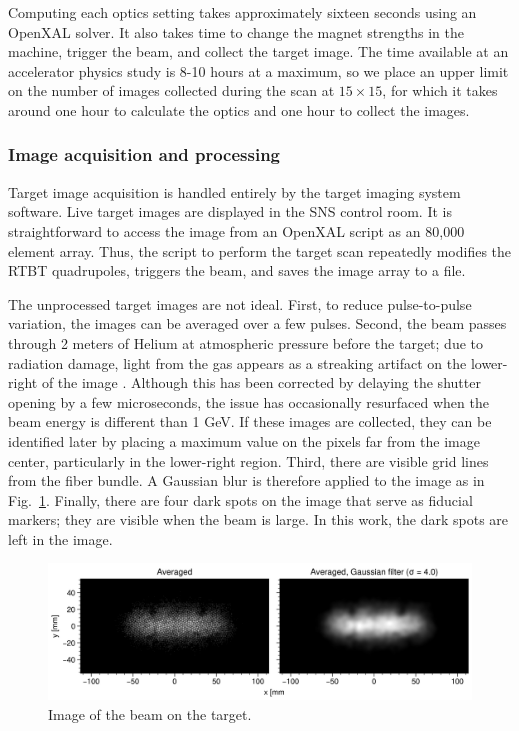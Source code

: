 %
Computing each optics setting takes approximately sixteen seconds using an OpenXAL solver. It also takes time to change the magnet strengths in the machine, trigger the beam, and collect the target image. The time available at an accelerator physics study is 8-10 hours at a maximum, so we place an upper limit on the number of images collected during the scan at $15 \times 15$, for which it takes around one hour to calculate the optics and one hour to collect the images. 


\subsubsection{Image acquisition and processing}

Target image acquisition is handled entirely by the target imaging system software. Live target images are displayed in the SNS control room. It is straightforward to access the image from an OpenXAL script as an 80,000 element array. Thus, the script to perform the target scan repeatedly modifies the RTBT quadrupoles, triggers the beam, and saves the image array to a file.

The unprocessed target images are not ideal. First, to reduce pulse-to-pulse variation, the images can be averaged over a few pulses. Second, the beam passes through 2 meters of Helium at atmospheric pressure before the target; due to radiation damage, light from the gas appears as a streaking artifact on the lower-right of the image \cite{Blokland2010}. Although this has been corrected by delaying the shutter opening by a few microseconds, the issue has occasionally resurfaced when the beam energy is different than 1 GeV. If these images are collected, they can be identified later by placing a maximum value on the pixels far from the image center, particularly in the lower-right region. Third, there are visible grid lines from the fiber bundle. A Gaussian blur is therefore applied to the image as in Fig.~\ref{fig:target_image}. Finally, there are four dark spots on the image that serve as fiducial markers; they are visible when the beam is large. In this work, the dark spots are left in the image.
%
\begin{figure}[!p]
    \centering
    \vspace*{5cm}
    \includegraphics[width=1.0\textwidth]{Images/chapter4/target_image.png}
    \caption{Image of the beam on the target.}
    \label{fig:target_image}
     \vspace*{5cm}
\end{figure}
%


